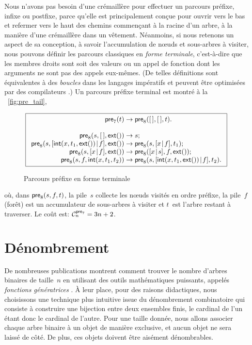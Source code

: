 Nous n'avons pas besoin d'une crémaillère pour effectuer un parcours préfixe, infixe ou
postfixe, parce qu'elle est principalement conçue pour ouvrir vers le
bas et refermer vers le haut des chemins commençant à la racine d'un
arbre, à la manière d'une crémaillère dans un vêtement. Néanmoins, si
nous retenons un aspect de sa conception, à savoir l'accumulation de
nœuds et sous-arbres à visiter, nous pouvons définir les parcours
classiques en \emph{forme terminale}, c'est-à-dire que les membres droits sont soit des
valeurs ou un appel de fonction dont les arguments ne sont pas des
appels eux-mêmes. (De telles définitions sont équivalentes à des
\emph{boucles} dans les langages impératifs et peuvent être optimisées
par des compilateurs \citep{Appel_1992}.) Un parcours préfixe terminal
est montré à la \fig~\vref{fig:pre_tail},
\begin{figure}[b]
\begin{equation*}
\boxed{
\begin{array}{r@{\;}c@{\;}l}
\fun{pre}_7(t) & \rightarrow & \fun{pre}_8(\el,\el,t).\\
\\
\fun{pre}_8(s,\el,\fun{ext}()) & \rightarrow & s;\\
\fun{pre}_8(s,\cons{\fun{int}(x,t_1,\fun{ext}())}{f},\fun{ext}()) &
\rightarrow & \fun{pre}_8(s,\cons{x}{f},t_1);\\
\fun{pre}_8(s,\cons{x}{f},\fun{ext}()) & \rightarrow &
\fun{pre}_8(\cons{x}{s},f,\fun{ext}());\\
\fun{pre}_8(s,f,\fun{int}(x,t_1,t_2)) & \rightarrow &
\fun{pre}_8(s,\cons{\fun{int}(x,t_1,\fun{ext}())}{f},t_2).
\end{array}}
\end{equation*}
\caption{Parcours préfixe en forme terminale}
\label{fig:pre_tail}
\end{figure}
où, dans \(\fun{pre}_8(s,f,t)\), la pile~\(s\) collecte les nœuds
visités en ordre préfixe, la pile~\(f\) (forêt) est un accumulateur de
sous-arbres à visiter et \(t\)~est l'arbre restant à traverser. Le
coût est: \(\C{\fun{pre}_7}{n} = 3n + 2\).

\section{Dénombrement}

De nombreuses publications \cite[\S~2.3.4.4]{Knuth_1997}
\cite[chap.~5]{SedgewickFlajolet_1996} montrent comment trouver le
nombre d'arbres binaires de taille~\(n\) en utilisant des outils
mathématiques puissants, appelés \emph{fonctions génératrices}
\cite[chap.~7]{GrahamKnuthPatashnik_1994}. À leur place, pour des
raisons didactiques, nous choisissons une technique plus intuitive
issue du dénombrement combinatoire
qui consiste à construire une bijection entre deux ensembles finis, le
cardinal de l'un étant donc le cardinal de l'autre. Pour une taille
donnée, nous allons associer chaque arbre binaire à un objet de
manière exclusive, et aucun objet ne sera laissé de côté. De plus, ces
objets doivent être aisément dénombrables.

